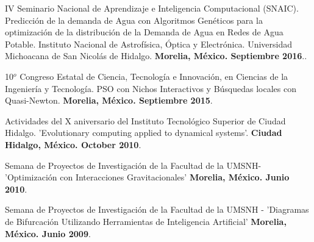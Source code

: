 \documentclass[10pt]{article}
\newenvironment{innerlist}[1][\enskip\textbullet]%
        {\begin{compactitem}[#1]}{\end{compactitem}}
\newcommand{\blankline}{\quad\pagebreak[2]}
\begin{document}
\begin{innerlist}
\item IV Seminario Nacional de Aprendizaje e Inteligencia Computacional (SNAIC). Predicción de la demanda de Agua con Algoritmos Genéticos para la optimización de la distribución de la Demanda de Agua en Redes de Agua Potable. Instituto Nacional de Astrofísica, Óptica y Electrónica. Universidad Michoacana de San Nicolás de Hidalgo. \textbf{Morelia, México. Septiembre 2016}..
 \item 10$^o$ Congreso Estatal de Ciencia, Tecnología e Innovación, en  Ciencias de la Ingeniería y Tecnología. PSO con Nichos Interactivos y B\'{u}squedas locales con Quasi-Newton. \textbf{Morelia, México. Septiembre 2015}.
 \item  Actividades del X aniversario del Instituto Tecnológico Superior de Ciudad Hidalgo. 'Evolutionary computing applied to dynamical systems'. \textbf{Ciudad Hidalgo, México. October 2010}.
\item Semana de Proyectos de Investigación de la Facultad de la UMSNH- 'Optimización con Interacciones Gravitacionales' \textbf{Morelia, México. Junio 2010}.
\item Semana de Proyectos de Investigación de la Facultad de la UMSNH - 'Diagramas de Bifurcación Utilizando Herramientas de Inteligencia Artificial' \textbf{Morelia, México. Junio 2009}.
\end{innerlist}

\blankline
\end{document}
